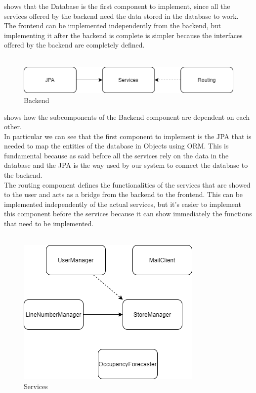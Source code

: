  shows that the Database is the first component to implement, since all the services offered by the backend
need the data stored in the database to work. \\
The frontend can be implemented independently from the backend, but implementing it after the backend is complete is simpler because the interfaces
offered by the backend are completely defined.\\
\\
\begin{figure}[H]
    \centering
    \includegraphics[height=0.4\textwidth]{Images/IntegrationAndTestingPlan/Backend.png}
    \caption{Backend}
    \label{fig:Backend}
\end{figure}
 shows how the subcomponents of the Backend component are dependent on each other. \\
In particular we can see that the first component to implement is the JPA that is needed to map the entities of the database in Objects
using ORM. This is fundamental because as said before all the services rely on the data in the database and the JPA is
the way used by our system to connect the database to the backend.\\
The routing component defines the functionalities of the services that are showed to the user and acts as a bridge from the backend
to the frontend.
This can be implemented independently of the actual services, but it's easier to implement this component before the services because
it can show immediately the functions that need to be implemented.\\
\\
\begin{figure}[H]
    \centering
    \includegraphics[height=0.4\textwidth]{Images/IntegrationAndTestingPlan/Services.png}
    \caption{Services}
    \label{fig:Services}
\end{figure}
